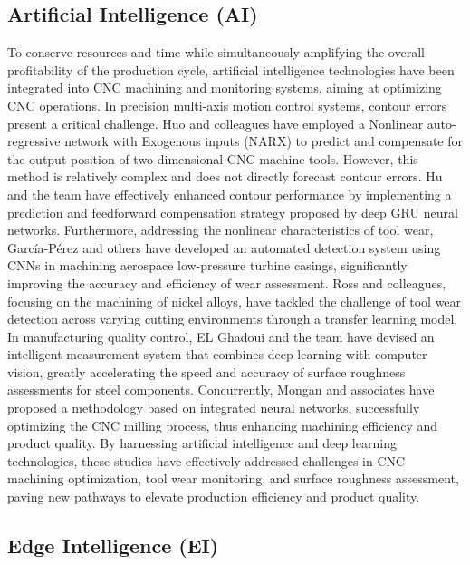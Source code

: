 \documentclass[preprint,12pt]{elsarticle}
\begin{document}
\subsection{Artificial Intelligence (AI)}

To conserve resources and time while simultaneously amplifying the overall profitability of the production cycle, artificial intelligence technologies have been integrated into CNC machining and monitoring systems, aiming at optimizing CNC operations. In precision multi-axis motion control systems, contour errors present a critical challenge. Huo and colleagues have employed a Nonlinear auto-regressive network with Exogenous inputs (NARX) to predict and compensate for the output position of two-dimensional CNC machine tools\cite{huo2013nonlinear}. However, this method is relatively complex and does not directly forecast contour errors. Hu and the team have effectively enhanced contour performance by implementing a prediction and feedforward compensation strategy proposed by deep GRU neural networks\cite{hu2020deep}. Furthermore, addressing the nonlinear characteristics of tool wear, García-Pérez and others have developed an automated detection system using CNNs in machining aerospace low-pressure turbine casings, significantly improving the accuracy and efficiency of wear assessment\cite{garcia2023cnn}. Ross and colleagues, focusing on the machining of nickel alloys, have tackled the challenge of tool wear detection across varying cutting environments through a transfer learning model\cite{ross2024novel}. In manufacturing quality control, EL Ghadoui and the team have devised an intelligent measurement system that combines deep learning with computer vision, greatly accelerating the speed and accuracy of surface roughness assessments for steel components\cite{el2023intelligent}. Concurrently, Mongan and associates have proposed a methodology based on integrated neural networks, successfully optimizing the CNC milling process, thus enhancing machining efficiency and product quality\cite{mongan2023ensemble}. By harnessing artificial intelligence and deep learning technologies, these studies have effectively addressed challenges in CNC machining optimization, tool wear monitoring, and surface roughness assessment, paving new pathways to elevate production efficiency and product quality.

\subsection{Edge Intelligence (EI)}
\end{document}
